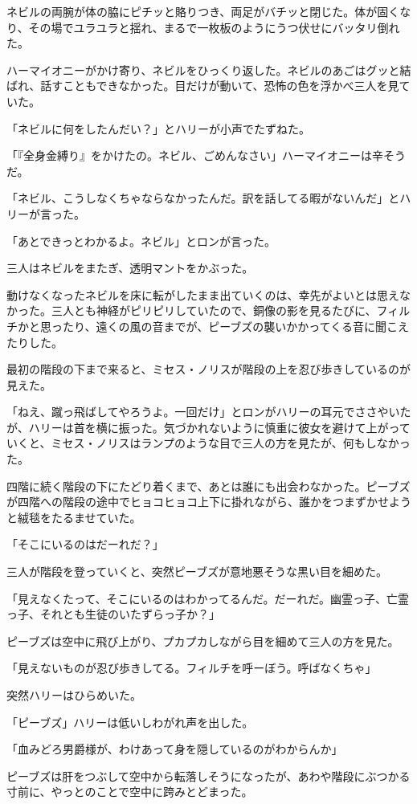 \documentclass[10pt,a4paper]{article}
\begin{document}
\begin{CJK}{UTF8}{min}
ネビルの両腕が体の脇にピチッと賂りつき、両足がバチッと閉じた。体が固くなり、その場でユラユラと揺れ、まるで一枚板のようにうつ伏せにバッタリ倒れた。

ハーマイオニーがかけ寄り、ネビルをひっくり返した。ネビルのあごはグッと結ばれ、話すこともできなかった。目だけが動いて、恐怖の色を浮かべ三人を見ていた。

「ネビルに何をしたんだい？」とハリーが小声でたずねた。

「『全身金縛り』をかけたの。ネビル、ごめんなさい」ハーマイオニーは辛そうだ。

「ネビル、こうしなくちゃならなかったんだ。訳を話してる暇がないんだ」とハリーが言った。

「あとできっとわかるよ。ネビル」とロンが言った。

三人はネビルをまたぎ、透明マントをかぶった。

動けなくなったネビルを床に転がしたまま出ていくのは、幸先がよいとは思えなかった。三人とも神経がピリピリしていたので、銅像の影を見るたびに、フィルチかと思ったり、遠くの風の音までが、ピーブズの襲いかかってくる音に聞こえたりした。

最初の階段の下まで来ると、ミセス・ノリスが階段の上を忍び歩きしているのが見えた。

「ねえ、蹴っ飛ばしてやろうよ。一回だけ」とロンがハリーの耳元でささやいたが、ハリーは首を横に振った。気づかれないように慎重に彼女を避けて上がっていくと、ミセス・ノリスはランプのような目で三人の方を見たが、何もしなかった。

四階に続く階段の下にたどり着くまで、あとは誰にも出会わなかった。ピーブズが四階への階段の途中でヒョコヒョコ上下に掛れながら、誰かをつまずかせようと絨毯をたるませていた。

「そこにいるのはだーれだ？」

三人が階段を登っていくと、突然ピーブズが意地悪そうな黒い目を細めた。

「見えなくたって、そこにいるのはわかってるんだ。だーれだ。幽霊っ子、亡霊っ子、それとも生徒のいたずらっ子か？」

ピーブズは空中に飛び上がり、プカプカしながら目を細めて三人の方を見た。

「見えないものが忍び歩きしてる。フィルチを呼ーぼう。呼ばなくちゃ」

突然ハリーはひらめいた。

「ピーブズ」ハリーは低いしわがれ声を出した。

「血みどろ男爵様が、わけあって身を隠しているのがわからんか」

ピーブズは肝をつぶして空中から転落しそうになったが、あわや階段にぶつかる寸前に、やっとのことで空中に跨みとどまった。


\end{CJK}
\end{document}
